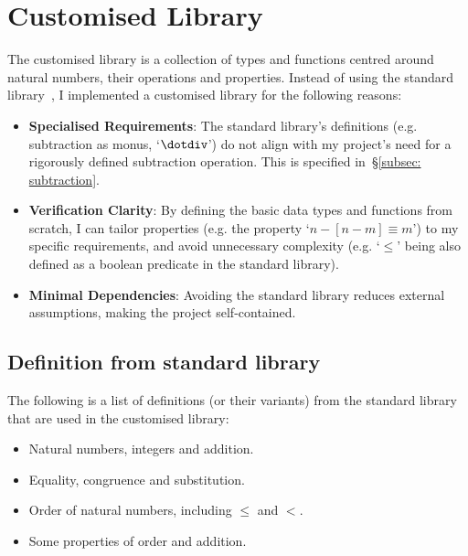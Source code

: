 \documentclass[12pt,a4paper]{report}
\theoremstyle{definition}
\newcommand{\secref}[1]{\S\ref{#1}}
\begin{document}
    \section{Customised Library} \label{sec: lib}
    The customised library is a collection of types and functions centred around natural numbers, their operations and properties. Instead of using the standard library~\autocite{agda_std}, I implemented a customised library for the following reasons:
    \begin{itemize}
        \item
            \textbf{Specialised Requirements}: The standard library's definitions (e.g. subtraction as monus, `$\dotdiv$') do not align with my project's need for a rigorously defined subtraction operation. This is specified in~\secref{subsec: subtraction}.
        \item
            \textbf{Verification Clarity}: By defining the basic data types and functions from scratch, I can tailor properties (e.g. the property `$n-[n-m] \equiv m$') to my specific requirements, and avoid unnecessary complexity (e.g. `$\leq$' being also defined as a boolean predicate in the standard library). 
        \item
            \textbf{Minimal Dependencies}: Avoiding the standard library reduces external assumptions, making the project self-contained. 
    \end{itemize}

    \subsection{Definition from standard library}
    The following is a list of definitions (or their variants) from the standard library that are used in the customised library:
    \begin{itemize}
        \item 
            Natural numbers, integers and addition.
        \item
            Equality, congruence and substitution.
        \item
            Order of natural numbers, including $\leq$ and $<$.
        \item
            Some properties of order and addition.
    \end{itemize}
\end{document}
